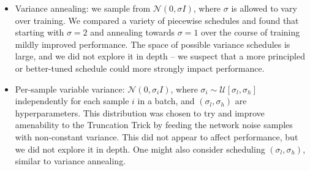 \begin{itemize}
\item Variance annealing: we sample from $\mathcal{N}(0, \sigma I)$, where $\sigma$ is allowed to vary over training. We compared a variety of piecewise schedules and found that starting with $\sigma = 2$ and annealing towards $\sigma=1$ over the course of training mildly improved performance. The space of possible variance schedules is large, and we did not explore it in depth -- we suspect that a more principled or better-tuned schedule could more strongly impact performance.

\item Per-sample variable variance: $\mathcal{N}(0, \sigma_i I)$, where $\sigma_i\sim\mathcal{U}[\sigma_l, \sigma_h]$ independently for each sample $i$ in a batch, and $(\sigma_l, \sigma_h)$ are hyperparameters. This distribution was chosen to try and improve amenability to the Truncation Trick by feeding the network noise samples with non-constant variance. This did not appear to affect performance, but we did not explore it in depth. One might also consider scheduling $(\sigma_l, \sigma_h)$, similar to variance annealing.

\end{itemize}



